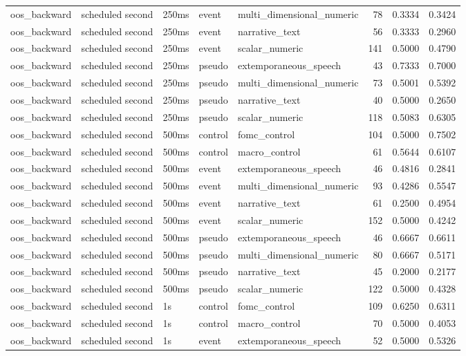 \begin{tabular}{lllllrrr}
oos_backward & scheduled second & 250ms & event & multi_dimensional_numeric & 78 & 0.3334 & 0.3424 \\
oos_backward & scheduled second & 250ms & event & narrative_text & 56 & 0.3333 & 0.2960 \\
oos_backward & scheduled second & 250ms & event & scalar_numeric & 141 & 0.5000 & 0.4790 \\
oos_backward & scheduled second & 250ms & pseudo & extemporaneous_speech & 43 & 0.7333 & 0.7000 \\
oos_backward & scheduled second & 250ms & pseudo & multi_dimensional_numeric & 73 & 0.5001 & 0.5392 \\
oos_backward & scheduled second & 250ms & pseudo & narrative_text & 40 & 0.5000 & 0.2650 \\
oos_backward & scheduled second & 250ms & pseudo & scalar_numeric & 118 & 0.5083 & 0.6305 \\
oos_backward & scheduled second & 500ms & control & fomc_control & 104 & 0.5000 & 0.7502 \\
oos_backward & scheduled second & 500ms & control & macro_control & 61 & 0.5644 & 0.6107 \\
oos_backward & scheduled second & 500ms & event & extemporaneous_speech & 46 & 0.4816 & 0.2841 \\
oos_backward & scheduled second & 500ms & event & multi_dimensional_numeric & 93 & 0.4286 & 0.5547 \\
oos_backward & scheduled second & 500ms & event & narrative_text & 61 & 0.2500 & 0.4954 \\
oos_backward & scheduled second & 500ms & event & scalar_numeric & 152 & 0.5000 & 0.4242 \\
oos_backward & scheduled second & 500ms & pseudo & extemporaneous_speech & 46 & 0.6667 & 0.6611 \\
oos_backward & scheduled second & 500ms & pseudo & multi_dimensional_numeric & 80 & 0.6667 & 0.5171 \\
oos_backward & scheduled second & 500ms & pseudo & narrative_text & 45 & 0.2000 & 0.2177 \\
oos_backward & scheduled second & 500ms & pseudo & scalar_numeric & 122 & 0.5000 & 0.4328 \\
oos_backward & scheduled second & 1s & control & fomc_control & 109 & 0.6250 & 0.6311 \\
oos_backward & scheduled second & 1s & control & macro_control & 70 & 0.5000 & 0.4053 \\
oos_backward & scheduled second & 1s & event & extemporaneous_speech & 52 & 0.5000 & 0.5326 \\

\end{tabular}
